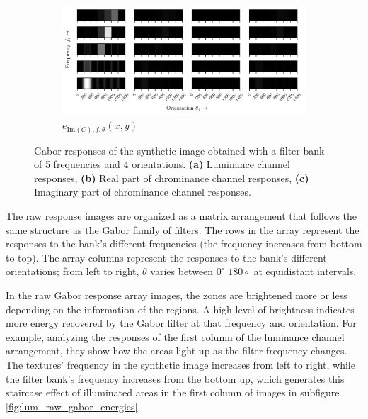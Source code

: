 \documentclass[journal]{IEEEtran}
\newcommand{\IM}{\mathrm{Im}}
\newcommand{\captext}[1]{\small{\textbf{\textsf{#1}}}}
\begin{document}
\begin{figure}[!ht]
\begin{subfigure}[b]{0.45\textwidth}
        \includegraphics[width=\textwidth]{gabor_resp_ci_synthetic}
        \caption{$e_{\IM(C), f, \theta}(x,y)$}
        \label{fig:ci_raw_gabor_energies} 
    \end{subfigure} 
    	    
    \caption{Gabor responses of the synthetic image obtained with a filter bank of 5 frequencies and 4 orientations. \captext{(a)} Luminance channel responses, \captext{(b)} Real part of chrominance channel responses, \captext{(c)} Imaginary part of chrominance channel responses.}\label{fig:synthetic_img_gresponses}    
\end{figure}

The raw response images are organized as a matrix arrangement that follows the same structure as the Gabor family of filters. The rows in the array represent the responses to the bank's different frequencies (the frequency increases from bottom to top). The array columns represent the responses to the bank's different orientations; from left to right, $\theta$ varies between $ 0^\circ $ $180\circ$ at equidistant intervals. 

In the raw Gabor response array images, the zones are brightened more or less depending on the information of the regions. A high level of brightness indicates more energy recovered by the Gabor filter at that frequency and orientation. For example, analyzing the responses of the first column of the luminance channel arrangement, they show how the areas light up as the filter frequency changes. The textures' frequency in the synthetic image increases from left to right, while the filter bank's frequency increases from the bottom up, which generates this staircase effect of illuminated areas in the first column of images in subfigure \ref{fig:lum_raw_gabor_energies}.
\end{document}
